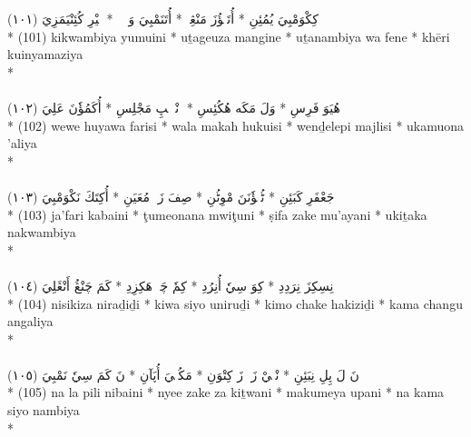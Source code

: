 \documentclass[a4paper, 12pt]{report}
\begin{document}
\begin{center}
\textarabic{(١٠١) \textcolor{mygreen}{كِكْوَمْبِيَ يُمُئِنِ  * أُتَڠٖؤُزَ مَنْڠِنٖ  * أُتَنَمْبِيَ وَ فٖنٖ  * خٖيْرِ كُئِنْيَمَزِيَ }} \\* 
(101) kikwambiya yumuini  * uṯageuza mangine  * uṯanambiya wa fene  * khēri kuinyamaziya  \\* 
 \\ 
\\[8mm] 

\textarabic{(١٠٢) \textcolor{mygreen}{وٖوٖ هُيَوَ فَرِسِ  * وَلَ مَكَه هُكُئِسِ  * وٖنْدٖلٖپِ مَجْلِسِ  * أُكَمُؤٗنَ عَلِيَ }} \\* 
(102) wewe huyawa farisi  * wala makah hukuisi  * wenḏelepi majlisi  * ukamuona 'aliya  \\* 
 \\ 
\\[8mm] 

\textarabic{(١٠٣) \textcolor{mygreen}{جَعْفَرِ كَبَئِنِ  * ٹُمٖؤٗنَنَ مْوِٹُنِ  * صِفَ زَكٖ مُعَيَنِ  * أُكِتَكَ نَكْوَمْبِيَ }} \\* 
(103) ja'fari kabaini  * ţumeonana mwiţuni  * ṣifa zake mu'ayani  * ukiṯaka nakwambiya  \\* 
 \\ 
\\[8mm] 

\textarabic{(١٠٤) \textcolor{mygreen}{نِسِكِزَ نِرَدِدِ  * كِوَ سِيٗ أُنِرُدِ  * كِمٗ چَكٖ هَكِزِدِ  * كَمَ چَنْڠُ أَنْڠَلِيَ }} \\* 
(104) nisikiza niraḏiḏi  * kiwa siyo uniruḏi  * kimo chake hakiziḏi  * kama changu angaliya  \\* 
 \\ 
\\[8mm] 

\textarabic{(١٠٥) \textcolor{mygreen}{نَ لَ پِلِ نِبَئِنِ  * نْيٖيْ زَكٖ زَ كِتْوَنِ  * مَكُمٖيَ أُپَآنِ  * نَ كَمَ سِيٗ نَمْبِيَ }} \\* 
(105) na la pili nibaini  * nyee zake za kiṯwani  * makumeya upani  * na kama siyo nambiya  \\* 
 \\ 
\\[8mm] 


\end{center}
\end{document}
